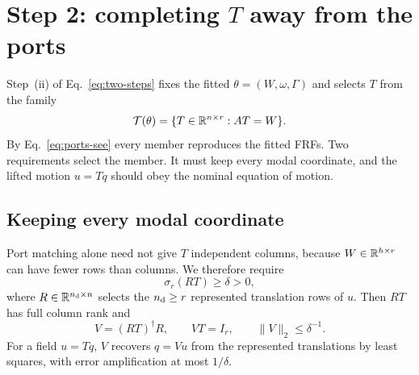 \section{Step 2: completing \texorpdfstring{$T$}{T} away from the ports}\label{sec:completion}
Step~(ii) of Eq.~\eqref{eq:two-steps} fixes the fitted
$\theta=(W,\omega,\Gamma)$ and selects $T$ from the family
\begin{equation}
 \mathcal T(\theta)=\{T\in\mathbb R^{n\times r}:AT=W\}.
 \label{eq:family}
\end{equation}
By Eq.~\eqref{eq:ports-see} every member reproduces the fitted FRFs. Two
requirements select the member. It must keep every modal coordinate, and
the lifted motion $u=Tq$ should obey the nominal equation of motion.

\subsection{Keeping every modal coordinate}
Port matching alone need not give $T$ independent columns, because
$W\in\mathbb R^{h\times r}$ can have fewer rows than columns. We therefore require
\begin{equation}
 \sigma_r(RT)\ge\delta>0,
 \label{eq:margin}
\end{equation}
where $R\in\mathbb R^{n_{\rm d}\times n}$ selects the $n_{\rm d}\ge r$ represented
translation rows of $u$. Then $RT$ has full column rank and
\begin{equation}
 V=(RT)^{\dagger}R,\qquad VT=I_r,\qquad\|V\|_2\le\delta^{-1}.
 \label{eq:completion-left-inverse}
\end{equation}
For a field $u=Tq$, $V$ recovers $q=Vu$ from the represented translations
by least squares, with error amplification at most $1/\delta$.

